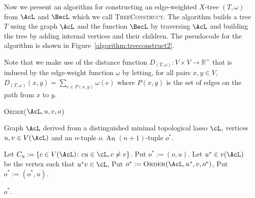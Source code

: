 Now we present an algorithm for constructing an edge-weighted $X$-tree
$(T,\omega)$ from $\AcL$ and $\BecL$ which we call \textsc{TreeConstruct}.
The algorithm builds a tree $T$ using the graph $\AcL$ and the function
$\BecL$ by traversing $\AcL$ and building the tree by adding internal vertices
and their children.  The pseudocode for the algorithm is shown in
Figure~\ref{algorithm:treeconstruct2}.

Note that we make use of the distance function $D_{(T,\omega)} \colon V
\times V \to \mathbb{R}^+$ that is induced by the edge-weight function
$\omega$ by letting, for all pairs $x,y \in V$, $D_{(T,\omega)}(x,y)
= \sum_{e \in P(x,y)} \omega(e)$ where $P(x,y)$ is the set of edges on the
path from $x$ to $y$.

\begin{algorithm}
  \caption{\textsc{Order}($\AcL,u,v,o$)}
  \label{algorithm:order}
  
  \begin{algorithmic}
    \Require Graph $\AcL$ derived from a distinguished minimal topological
    lasso $\cL$, vertices $u,v \in V(\AcL)$ and an $n$-tuple $o$.
    \Ensure An $(n+1)$-tuple $o^*$.

    \State Let $C_u := \{c \in V(\AcL) \colon cu \in \cL, c \neq v\}$.
    \State Put $o^* := (o,u)$.
    \State Let $u^* \in v(\AcL)$ be the vertex such that $u^*v \in \cL$,
    \State Put $o^* := \text{\textsc{Order}}(\AcL, u^*, v, o^*)$,
    \State Put $o^* := (o^*, u)$.
    \EndIf
    \EndFor

    \State \Return $o^*$.
  \end{algorithmic}
\end{algorithm}

